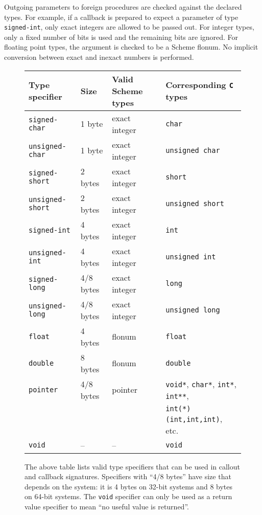 \documentclass[onecolumn, 12pt, twoside, openright, dvipdfm]{book}
\begin{document}
Outgoing parameters to foreign procedures are checked against the
declared types.  For example, if a callback is prepared to expect a
parameter of type \texttt{signed-int}, only exact integers are
allowed to be passed out.  For integer types, only a fixed number of
bits is used and the remaining bits are ignored.  For floating point
types, the argument is checked to be a Scheme flonum.  No implicit
conversion between exact and inexact numbers is performed.
{
\begin{figure}[b!]
\begin{center}
\begin{tabular}{@{}llll@{}}
\hline
Type specifier & Size  & Valid Scheme types & Corresponding \texttt{C} types\\
\hline 
\texttt{signed-char} & 1 byte & exact integer & \texttt{char}\\
\texttt{unsigned-char} & 1 byte & exact integer & \texttt{unsigned char}\\
\texttt{signed-short} & 2 bytes & exact integer & \texttt{short}\\
\texttt{unsigned-short} & 2 bytes & exact integer & \texttt{unsigned short}\\
\texttt{signed-int} & 4 bytes & exact integer & \texttt{int}\\
\texttt{unsigned-int} & 4 bytes & exact integer & \texttt{unsigned int}\\
\texttt{signed-long} & 4/8 bytes & exact integer & \texttt{long}\\
\texttt{unsigned-long} & 4/8 bytes & exact integer & \texttt{unsigned long}\\
\texttt{float} & 4 bytes & flonum & \texttt{float}\\
\texttt{double} & 8 bytes & flonum & \texttt{double}\\
\texttt{pointer} & 4/8 bytes & pointer & 
\texttt{void*}, \texttt{char*}, \texttt{int*}, \texttt{int**}, \\
&&& \texttt{int(*)(int,int,int)}, etc. \\
\texttt{void} & -- & -- & \texttt{void}\\
\hline
\end{tabular}
\end{center}
\caption{\label{fig:foreign-types}The above table lists valid type
specifiers that can be used in callout and callback signatures.  
Specifiers with ``4/8 bytes'' have size that depends on the system:
it is 4 bytes on 32-bit systems and 8 bytes on 64-bit systems.  The
\texttt{void} specifier can only be used as a return value
specifier to mean ``no useful value is returned''.}
\end{figure}
}
\end{document}
